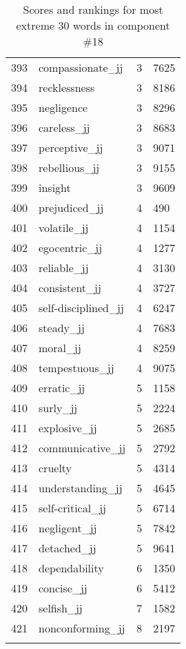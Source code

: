 \begin{longtable}[!htbp]{| rlr@{.}l |}
    393 & compassionate\_jj & 3 & 7625 \\
    394 & recklessness & 3 & 8186 \\
    395 & negligence & 3 & 8296 \\
    396 & careless\_jj & 3 & 8683 \\
    397 & perceptive\_jj & 3 & 9071 \\
    398 & rebellious\_jj & 3 & 9155 \\
    399 & insight & 3 & 9609 \\
    400 & prejudiced\_jj & 4 & 490 \\
    401 & volatile\_jj & 4 & 1154 \\
    402 & egocentric\_jj & 4 & 1277 \\
    403 & reliable\_jj & 4 & 3130 \\
    404 & consistent\_jj & 4 & 3727 \\
    405 & self-disciplined\_jj & 4 & 6247 \\
    406 & steady\_jj & 4 & 7683 \\
    407 & moral\_jj & 4 & 8259 \\
    408 & tempestuous\_jj & 4 & 9075 \\
    409 & erratic\_jj & 5 & 1158 \\
    410 & surly\_jj & 5 & 2224 \\
    411 & explosive\_jj & 5 & 2685 \\
    412 & communicative\_jj & 5 & 2792 \\
    413 & cruelty & 5 & 4314 \\
    414 & understanding\_jj & 5 & 4645 \\
    415 & self-critical\_jj & 5 & 6714 \\
    416 & negligent\_jj & 5 & 7842 \\
    417 & detached\_jj & 5 & 9641 \\
    418 & dependability & 6 & 1350 \\
    419 & concise\_jj & 6 & 5412 \\
    420 & selfish\_jj & 7 & 1582 \\
    421 & nonconforming\_jj & 8 & 2197 \\
    \hline
    \caption{Scores and rankings for most extreme 30 words in component \#18} \\
\end{longtable}
